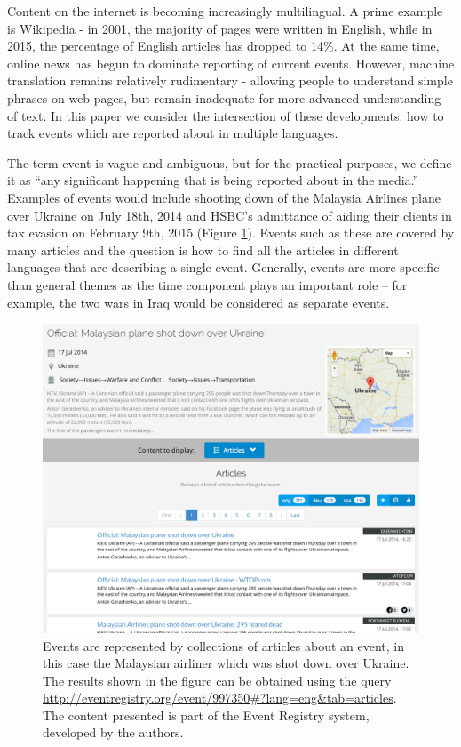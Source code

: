 \documentclass[twoside,11pt]{article}
\begin{document}
Content on the internet is becoming increasingly multilingual. A prime example is Wikipedia - in 2001, the majority of pages were written in English, while in 2015, the percentage of English articles has dropped to 14\%. At the same time, online news has begun to dominate reporting of current events. However, machine translation remains relatively rudimentary - allowing people to understand simple phrases on web pages, but remain inadequate for more advanced understanding of text. In this paper we consider the intersection of these developments: how to track events which are reported about in multiple languages.

The term event is vague and ambiguous, but for the practical purposes, we define it as ``any significant happening that is being reported about in the media.'' Examples of events would include shooting down of the Malaysia Airlines plane over Ukraine on July 18th, 2014 and HSBC's admittance of aiding their clients in tax evasion on February 9th, 2015 (Figure \ref{fig:event2}). Events such as these are covered by many articles and the question is how to find all the articles in different languages that are describing a single event. Generally, events are more specific than general themes as the time component plays an important role -- for example, the two wars in Iraq would be considered as separate events.


\begin{figure}
\centering
\includegraphics[width=1\textwidth]{events2.png}
\caption{\label{fig:event2} Events are represented by collections of articles about an event, in this case the Malaysian airliner which was shot down over Ukraine. The results shown in the figure can be obtained using the query \url{http://eventregistry.org/event/997350\#?lang=eng\&tab=articles}. The content presented is part of the Event Registry system, developed by the authors.}
\end{figure}
\end{document}
